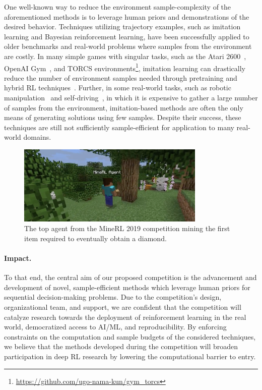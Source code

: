 One well-known way to reduce the environment sample-complexity of the aforementioned methods is to leverage human priors and demonstrations of the desired behavior. 
    Techniques utilizing trajectory examples, such as imitation learning and Bayesian reinforcement learning, have been successfully applied to older benchmarks and real-world problems where samples from the environment are costly.  
        In many simple games with singular tasks, such as the Atari 2600~\cite{bellemare2013arcade}, OpenAI Gym~\cite{gym}, and TORCS environments\footnote{\url{https://github.com/ugo-nama-kun/gym_torcs}}, imitation learning can drastically reduce the number of environment samples needed through pretraining and hybrid RL techniques~\cite{cruz2017pre,gao2018reinforcement,hester2018deep,panse2018imitation}.
        Further, in some real-world tasks, such as robotic manipulation~\cite{finn2016guided,finn2017one} and self-driving~\cite{bojarski2016end}, in which it is expensive to gather a large number of samples from the environment, imitation-based methods are often the only means of generating solutions using few samples.
    Despite their success, these techniques are still not sufficiently sample-efficient for application to many real-world domains. 


\begin{figure}
    \centering
    \includegraphics[width=0.8\textwidth]{assets/2019.png}
    \caption{\small{The top agent from the MineRL 2019 competition mining the first item required to eventually obtain a diamond.}}
\end{figure}

\paragraph{Impact.} To that end, the central aim of our proposed competition is the advancement and development of novel, sample-efficient methods which leverage human priors for sequential decision-making problems. 
    Due to the competition's design, organizational team, and support, we are confident that the competition will catalyze research towards the deployment of reinforcement learning in the real world, democratized access to AI/ML, and reproducibility. 
    By enforcing constraints on the computation and sample budgets of the considered techniques, we believe that the methods developed during the competition will broaden participation in deep RL research by lowering the computational barrier to entry. 

